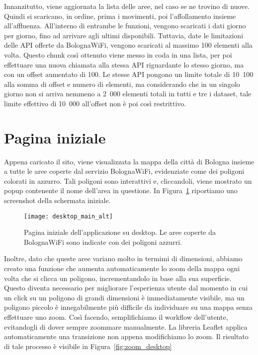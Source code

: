 Innanzitutto, viene aggiornata la lista delle aree, nel caso se ne trovino di nuove. Quindi si scaricano, in ordine, prima i movimenti, poi l'affollamento insieme all'affluenza. All'interno di entrambe le funzioni, vengono scaricati i dati giorno per giorno, fino ad arrivare agli ultimi disponibili. Tuttavia, date le limitazioni delle API offerte da BolognaWiFi, vengono scaricati al massimo 100 elementi alla volta. Questo chunk così ottenuto viene messo in coda in una lista, per poi effettuare una nuova chiamata alla stessa API riguardante lo stesso giorno, ma con un offset aumentato di 100. Le stesse API pongono un limite totale di 10~100 alla somma di offset e numero di elementi, ma considerando che in un singolo giorno non si arriva nemmeno a 2~000 elementi totali in tutti e tre i dataset, tale limite effettivo di 10~000 all'offset non è poi così restrittivo.

\section{Pagina iniziale}
Appena caricato il sito, viene visualizzata la mappa della città di Bologna insieme a tutte le aree coperte dal servizio BolognaWiFi, evidenziate come dei poligoni colorati in azzurro. Tali poligoni sono interattivi e, cliccandoli, viene mostrato un popup contenente il nome dell'area in questione. In Figura~\ref{fig:desktop_main} riportiamo uno screenshot della schermata iniziale.

\begin{figure}[H]
    \centering
    \texttt{[image: desktop\_main\_alt]}
    \caption[Pagina iniziale su desktop]{Pagina iniziale dell'applicazione su desktop. Le aree coperte da BolognaWiFi sono indicate con dei poligoni azzurri.}
    \label{fig:desktop_main}
\end{figure}

Inoltre, dato che queste aree variano molto in termimi di dimensioni, abbiamo creato una funzione che aumenta automaticamente lo zoom della mappa ogni volta che si clicca un poligono, incrementandolo in base alla sua superficie. Questo diventa necessario per migliorare l'esperienza utente dal momento in cui un click su un poligono di grandi dimensioni è immediatamente visibile, ma un poligono piccolo è innegabilmente più difficile da individuare su una mappa senza effettuare uno zoom. Così facendo, semplifichiamo il workflow dell'utente, evitandogli di dover sempre zoommare manualmente. La libreria Leaflet applica automaticamente una transizione non appena modifichiamo lo zoom. Il risultato di tale processo è visibile in Figura~\ref{fig:zoom_desktop}

